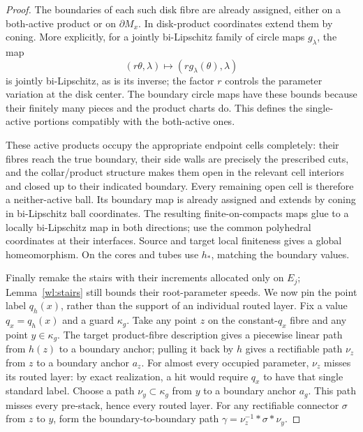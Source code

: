 \documentclass[11pt]{article}
\numberwithin{equation}{section}
\theoremstyle{definition}
\theoremstyle{remark}
\begin{document}
\begin{proof}
The boundaries of each such disk fibre are already assigned, either
on a both-active product or on $\partial M_x$.  In disk-product
coordinates extend them by coning.  More explicitly, for a jointly
bi-Lipschitz family of circle maps $g_\lambda$, the map
\[
 (r\theta,\lambda)\longmapsto
             (r g_\lambda(\theta),\lambda)
\]
is jointly bi-Lipschitz, as is its inverse; the factor $r$ controls
the parameter variation at the disk center.  The boundary circle
maps have these bounds because their finitely many pieces and the
product charts do.  This defines the single-active portions
compatibly with the both-active ones.

These active products occupy the appropriate endpoint cells
completely: their fibres reach the true boundary, their side walls
are precisely the prescribed cuts, and the collar/product
structure makes them open in the relevant cell interiors and
closed up to their indicated boundary.  Every remaining open cell
is therefore a neither-active ball.  Its boundary map is already
assigned and extends by coning in bi-Lipschitz ball coordinates.
The resulting finite-on-compacts maps glue to a locally
bi-Lipschitz map in both directions; use the common polyhedral
coordinates at their interfaces.  Source and target local
finiteness gives a global homeomorphism.  On the cores and tubes
use $h_*$, matching the boundary values.

Finally remake the stairs with their increments allocated only on
$E_j$; Lemma~\ref{wl:stairs} still bounds their root-parameter speeds.
We now pin the point label $q_h(x)$, rather than the support of an
individual routed layer.  Fix a value $q_x=q_h(x)$ and a guard
$\kappa_g$.  Take any point
$z$ on the constant-$q_x$ fibre and any point $y\in\kappa_g$.
The target product-fibre description gives a piecewise linear path
from $h(z)$ to a boundary anchor; pulling it back by $h$ gives
a rectifiable path $\nu_z$ from $z$ to a boundary anchor $a_z$.
For almost every occupied parameter, $\nu_z$ misses its routed
layer: by exact realization, a hit would require $q_x$ to have that
single standard label.  Choose a path $\nu_y\subset\kappa_g$
from $y$ to a boundary anchor $a_g$.  This path misses every
pre-stack, hence every routed layer.  For any rectifiable connector
$\sigma$ from $z$ to $y$, form the boundary-to-boundary path
$\gamma=\nu_z^{-1}*\sigma*\nu_y$.


\end{proof}
\end{document}
